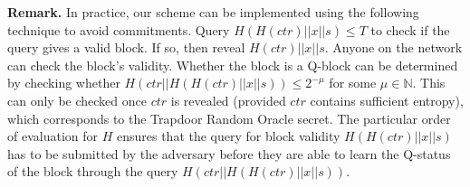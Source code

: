 \noindent
\textbf{Remark.}
In practice, our scheme can be implemented using the following technique to
avoid commitments. Query $H(H(ctr) || x || s) \leq T$ to check if the query gives
a valid block. If so, then reveal $H(ctr) || x || s$. Anyone on the network can
check the block's validity. Whether the block is a Q-block can be determined by
checking whether $H(ctr || H(H(ctr) || x || s)) \leq 2^{-\mu}$ for some
$\mu \in \mathbb{N}$.
This can only be checked once $ctr$ is revealed (provided $ctr$ contains
sufficient entropy), which corresponds to the Trapdoor Random Oracle secret.
The particular order of evaluation for $H$ ensures that the query for block
validity $H(H(ctr) || x || s)$ has to be submitted by the adversary before they
are able to learn the Q-status of the block through the query
$H(ctr || H(H(ctr) || x || s))$.
